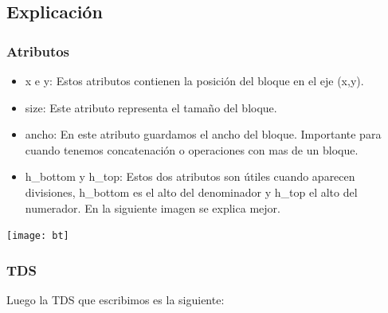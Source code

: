 \subsection{Explicaci\'on}
\subsubsection{Atributos}

\begin{itemize}
  \item x e y: Estos atributos contienen la posici\'on del bloque en el eje (x,y).
  \item size: Este atributo representa el tama\~no del bloque.
  \item ancho: En este atributo guardamos el ancho del bloque. Importante para cuando tenemos concatenaci\'on o operaciones con mas de un bloque.
  \item h\_bottom y h\_top: Estos dos atributos son \'utiles cuando aparecen divisiones, h\_bottom es el alto del denominador y h\_top el alto del numerador. En la siguiente imagen se explica mejor.
\end{itemize}

\begin{center}
\texttt{[image: bt]}
\end{center}
\newpage
\subsubsection{TDS}

Luego la TDS que escribimos es la siguiente:

